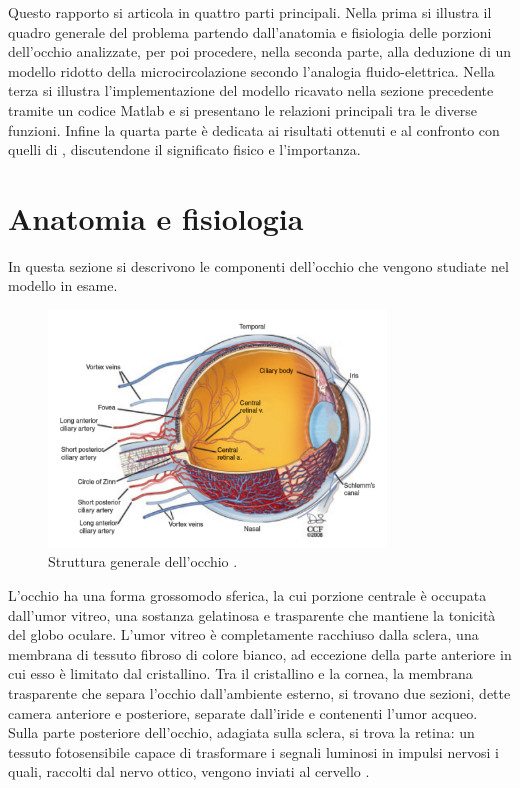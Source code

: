 \documentclass{article}
\begin{document}
Questo rapporto si articola in quattro parti principali.
Nella prima si illustra il quadro generale del problema partendo dall'anatomia e fisiologia delle porzioni dell'occhio analizzate, per poi procedere, nella seconda parte, alla deduzione di un modello ridotto della microcircolazione secondo l'analogia fluido-elettrica.
Nella terza si illustra l'implementazione del modello ricavato nella sezione precedente tramite un codice Matlab e si presentano le relazioni principali tra le diverse funzioni.
Infine la quarta parte è dedicata ai risultati ottenuti e al confronto con quelli di \cite{art1}, discutendone il significato fisico e l'importanza.


\section{Anatomia e fisiologia}
In questa sezione si descrivono le componenti dell'occhio che vengono studiate nel modello in esame.
\begin{figure}[h]
\begin{center}
\includegraphics[width=0.8\textwidth]{Pictures/occhio.png}
\caption{Struttura generale dell'occhio \cite{Tesi}.}
\label{eyeball}
\end{center}
\end{figure}
L'occhio ha una forma grossomodo sferica, la cui porzione centrale è occupata dall'umor vitreo, una sostanza gelatinosa e trasparente che mantiene la tonicità del globo oculare. 
L'umor vitreo è completamente racchiuso dalla sclera, una membrana di tessuto fibroso di colore bianco, ad eccezione della parte anteriore in cui esso è limitato dal cristallino.
Tra il cristallino e la cornea, la membrana trasparente che separa l'occhio dall'ambiente esterno, si trovano due sezioni, dette camera anteriore e posteriore, separate dall'iride e contenenti l'umor acqueo.
Sulla parte posteriore dell'occhio, adagiata sulla sclera, si trova la retina: un tessuto fotosensibile capace di trasformare i segnali luminosi in impulsi nervosi i quali, raccolti dal nervo ottico, vengono inviati al cervello \cite{Tesi}.
\end{document}

